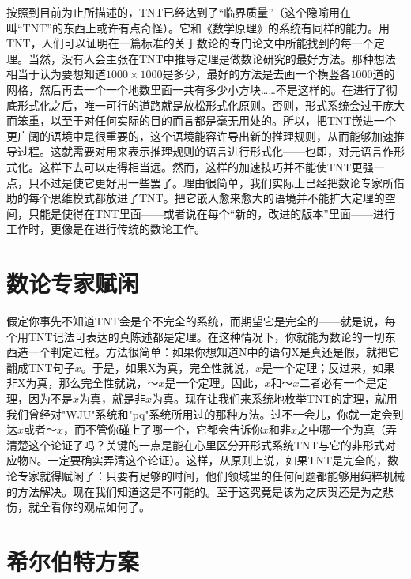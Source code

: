 按照到目前为止所描述的，TNT已经达到了“临界质量”（这个隐喻用在叫“TNT”的东西上或许有点奇怪）。它和《数学原理》的系统有同样的能力。用TNT，人们可以证明在一篇标准的关于数论的专门论文中所能找到的每一个定理。当然，没有人会主张在TNT中推导定理是做数论研究的最好方法。那种想法相当于认为要想知道$1000\times 1000$是多少，最好的方法是去画一个横竖各$1000$道的网格，然后再去一个一个地数里面一共有多少小方块……不是这样的。在进行了彻底形式化之后，唯一可行的道路就是放松形式化原则。否则，形式系统会过于庞大而笨重，以至于对任何实际的目的而言都是毫无用处的。所以，把TNT嵌进一个更广阔的语境中是很重要的，这个语境能容许导出新的推理规则，从而能够加速推导过程。这就需要对用来表示推理规则的语言进行形式化——也即，对元语言作形式化。这样下去可以走得相当远。然而，这样的加速技巧并不能使TNT更强一点，只不过是使它更好用一些罢了。理由很简单，我们实际上已经把数论专家所借助的每个思维模式都放进了TNT。把它嵌入愈来愈大的语境并不能扩大定理的空间，只能是使得在TNT里面——或者说在每个“新的，改进的版本”里面——进行工作时，更像是在进行传统的数论工作。

\section{数论专家赋闲}

假定你事先不知道TNT会是个不完全的系统，而期望它是完全的——就是说，每个用TNT记法可表达的真陈述都是定理。在这种情况下，你就能为数论的一切东西造一个判定过程。方法很简单：如果你想知道N中的语句X是真还是假，就把它翻成TNT句子$x$。于是，如果X为真，完全性就说，$x$是一个定理；反过来，如果非X为真，那么完全性就说，$～x$是一个定理。因此，$x$和$～x$二者必有一个是定理，因为不是$x$为真，就是非$x$为真。现在让我们来系统地枚举TNT的定理，就用我们曾经对"WJU"系统和"pq"系统所用过的那种方法。过不一会儿，你就一定会到达$x$或者$～x$，而不管你碰上了哪一个，它都会告诉你$x$和非$x$之中哪一个为真（弄清楚这个论证了吗？关键的一点是能在心里区分开形式系统TNT与它的非形式对应物N。一定要确实弄清这个论证）。这样，从原则上说，如果TNT是完全的，数论专家就得赋闲了：只要有足够的时间，他们领域里的任何问题都能够用纯粹机械的方法解决。现在我们知道这是不可能的。至于这究竟是该为之庆贺还是为之悲伤，就全看你的观点如何了。

\section{希尔伯特方案}

